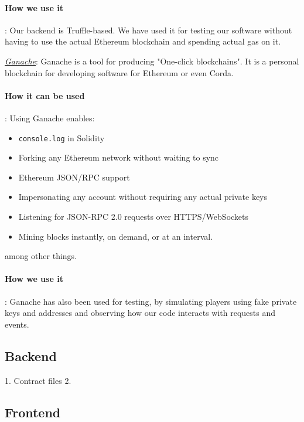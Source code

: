 \documentclass{article}
\begin{document}
    \paragraph{How we use it}:
    Our backend is Truffle-based. We have used it for testing our software without having to use the actual Ethereum blockchain and spending actual gas on it.
    
    \href{https://trufflesuite.com/ganache/}{\textit{Ganache}}:
    Ganache is a tool for producing "One-click blockchains". It is a personal blockchain for developing software for Ethereum or even Corda. 
    \paragraph{How it can be used}:
    Using Ganache enables:
    \begin{itemize}
        \item \verb|console.log| in Solidity
        \item Forking any Ethereum network without waiting to sync
        \item Ethereum JSON/RPC support
        \item Impersonating any account without requiring any actual private keys
        \item Listening for JSON-RPC 2.0 requests over HTTPS/WebSockets
        \item Mining blocks instantly, on demand, or at an interval.
    \end{itemize}
    among other things.
    
    \paragraph{How we use it}:
    Ganache has also been used for testing, by simulating players using fake private keys and addresses and observing how our code interacts with requests and events.
    



\subsection{Backend}

1. Contract files
2. 

\subsection{Frontend}
\end{document}
